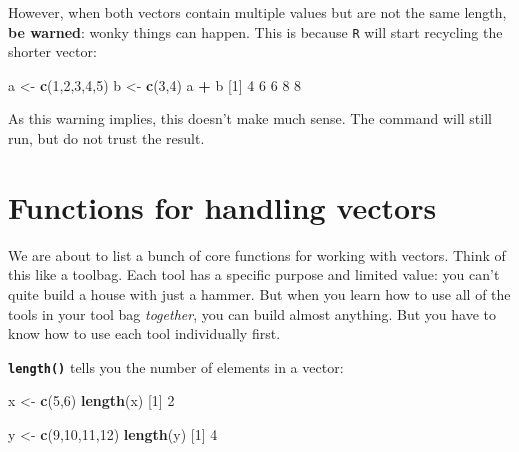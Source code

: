 \documentclass[
]{book}
\newenvironment{Shaded}{\begin{snugshade}}{\end{snugshade}}
\newcommand{\DecValTok}[1]{\textcolor[rgb]{0.00,0.00,0.81}{#1}}
\newcommand{\FunctionTok}[1]{\textcolor[rgb]{0.13,0.29,0.53}{\textbf{#1}}}
\newcommand{\NormalTok}[1]{#1}
\newcommand{\OtherTok}[1]{\textcolor[rgb]{0.56,0.35,0.01}{#1}}
\newcommand{\SpecialCharTok}[1]{\textcolor[rgb]{0.81,0.36,0.00}{\textbf{#1}}}
\begin{document}
However, when both vectors contain multiple values but are not the same length, \textbf{be warned}: wonky things can happen. This is because \texttt{R} will start recycling the shorter vector:

\begin{Shaded}
\begin{Highlighting}[]
\NormalTok{a }\OtherTok{\textless{}{-}} \FunctionTok{c}\NormalTok{(}\DecValTok{1}\NormalTok{,}\DecValTok{2}\NormalTok{,}\DecValTok{3}\NormalTok{,}\DecValTok{4}\NormalTok{,}\DecValTok{5}\NormalTok{)}
\NormalTok{b }\OtherTok{\textless{}{-}} \FunctionTok{c}\NormalTok{(}\DecValTok{3}\NormalTok{,}\DecValTok{4}\NormalTok{)}
\NormalTok{a }\SpecialCharTok{+}\NormalTok{ b}
\NormalTok{[}\DecValTok{1}\NormalTok{] }\DecValTok{4} \DecValTok{6} \DecValTok{6} \DecValTok{8} \DecValTok{8}
\end{Highlighting}
\end{Shaded}

As this warning implies, this doesn't make much sense. The command will still run, but do not trust the result.

\section*{Functions for handling vectors}\label{functions-for-handling-vectors}

We are about to list a bunch of core functions for working with vectors. Think of this like a toolbag. Each tool has a specific purpose and limited value: you can't quite build a house with just a hammer. But when you learn how to use all of the tools in your tool bag \emph{together}, you can build almost anything. But you have to know how to use each tool individually first.

\textbf{\texttt{length()}} tells you the number of elements in a vector:

\begin{Shaded}
\begin{Highlighting}[]
\NormalTok{x }\OtherTok{\textless{}{-}} \FunctionTok{c}\NormalTok{(}\DecValTok{5}\NormalTok{,}\DecValTok{6}\NormalTok{)}
\FunctionTok{length}\NormalTok{(x)}
\NormalTok{[}\DecValTok{1}\NormalTok{] }\DecValTok{2}
\end{Highlighting}
\end{Shaded}

\begin{Shaded}
\begin{Highlighting}[]
\NormalTok{y }\OtherTok{\textless{}{-}} \FunctionTok{c}\NormalTok{(}\DecValTok{9}\NormalTok{,}\DecValTok{10}\NormalTok{,}\DecValTok{11}\NormalTok{,}\DecValTok{12}\NormalTok{)}
\FunctionTok{length}\NormalTok{(y)}
\NormalTok{[}\DecValTok{1}\NormalTok{] }\DecValTok{4}
\end{Highlighting}
\end{Shaded}
\end{document}

